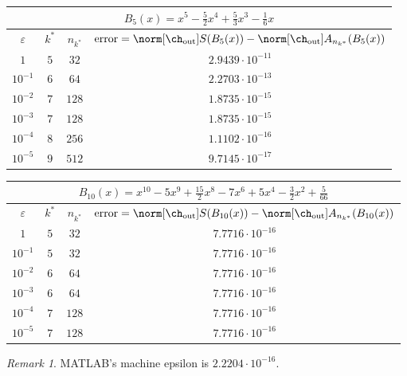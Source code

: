 \documentclass[final]{elsarticle}
\newcommand{\chout}{\ch_{\text{\rm{out}}}}
\theoremstyle{definition}
\theoremstyle{remark}
\newtheorem{rem}{Remark}
\begin{document}
\begin{center}
\begin{tabular}{|c|c|c|c|}
  \hline
  \multicolumn{4}{|c|}{$B_5(x)=x^5-\frac{5}{2}x^4+\frac{5}{3}x^3-\frac{1}{6}x$} \\
  \hline
  $\varepsilon$ & $k^*$ & $n_{k^*}$ & $\operatorname{error}=\norm[\chout]{S(B_5(x))}-\norm[\chout]{A_{n_{k^*}}(B_5(x))}$ \\
  \hline
  $1$ & $5$ & $32$ & $2.9439\cdot10^{-11}$ \\
  $10^{-1}$ & $6$ & $64$ & $2.2703\cdot10^{-13}$ \\
  $10^{-2}$ & $7$ & $128$ & $1.8735\cdot10^{-15}$ \\
  $10^{-3}$ & $7$ & $128$ & $1.8735\cdot10^{-15}$ \\
  $10^{-4}$ & $8$ & $256$ & $1.1102\cdot10^{-16}$ \\
  $10^{-5}$ & $9$ & $512$ & $9.7145\cdot10^{-17}$ \\
  \hline
\end{tabular}
\end{center}

\begin{center}
\begin{tabular}{|c|c|c|c|}
  \hline
  \multicolumn{4}{|c|}{$B_{10}(x)=x^{10}-5x^9+\frac{15}{2}x^8-7x^6+5x^4-\frac{3}{2}x^2+\frac{5}{66}$} \\
  \hline
  $\varepsilon$ & $k^*$ & $n_{k^*}$ & $\operatorname{error}=\norm[\chout]{S(B_{10}(x))}-\norm[\chout]{A_{n_{k^*}}(B_{10}(x))}$ \\
  \hline
  $1$ & $5$ & $32$ & $7.7716\cdot10^{-16}$ \\
  $10^{-1}$ & $5$ & $32$ & $7.7716\cdot10^{-16}$ \\
  $10^{-2}$ & $6$ & $64$ & $7.7716\cdot10^{-16}$ \\
  $10^{-3}$ & $6$ & $64$ & $7.7716\cdot10^{-16}$ \\
  $10^{-4}$ & $7$ & $128$ & $7.7716\cdot10^{-16}$ \\
  $10^{-5}$ & $7$ & $128$ & $7.7716\cdot10^{-16}$ \\
  \hline
\end{tabular}
\end{center}

\begin{rem}
MATLAB's machine epsilon is $2.2204\cdot10^{-16}$.
\end{rem}
\end{document}
